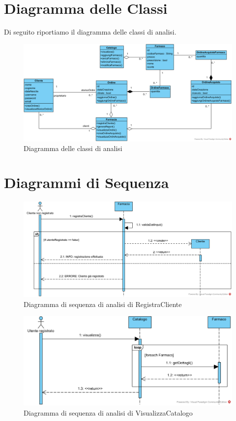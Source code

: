 \section{Diagramma delle Classi}
Di seguito riportiamo il diagramma delle classi di analisi.
\begin{figure}[!ht]
	\centering
	\includegraphics[width=\linewidth]{assets/ClassDiagramAnalisi.png}
	\caption{Diagramma delle classi di analisi}
\end{figure}

\section{Diagrammi di Sequenza}

\begin{figure}[!h]
	\centering
	\includegraphics[width=\linewidth]{assets/sequence_analisi/RegistraCliente.png}
	\caption{Diagramma di sequenza di analisi di RegistraCliente}
\end{figure}

\vfill
\pagebreak

\begin{figure}[!hbp]
	\centering
	\includegraphics[width=0.8\linewidth]{assets/sequence_analisi/VisualizzaCatalogo.png}
	\caption{Diagramma di sequenza di analisi di VisualizzaCatalogo}
\end{figure}

